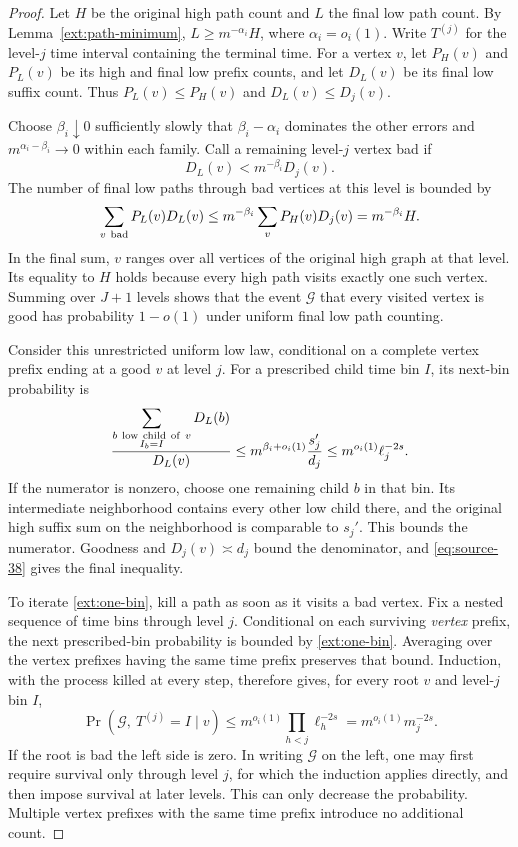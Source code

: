 \begin{proof}
Let \(H\) be the original high path count and \(L\) the final
low path count. By Lemma~\ref{ext:path-minimum},
\(L\geq m^{-\alpha_i}H\), where \(\alpha_i=o_i(1)\).
Write \(T^{(j)}\) for the level-\(j\) time interval containing
the terminal time.
For a vertex \(v\), let \(P_H(v)\) and \(P_L(v)\) be its high
and final low prefix counts, and let \(D_L(v)\) be its final
low suffix count. Thus \(P_L(v)\leq P_H(v)\) and
\(D_L(v)\leq D_j(v)\).

Choose \(\beta_i\downarrow0\) sufficiently slowly that
\(\beta_i-\alpha_i\) dominates the other errors and
\(m^{\alpha_i-\beta_i}\to0\) within each family. Call a remaining
level-\(j\) vertex bad if
\[
                         D_L(v)<m^{-\beta_i}D_j(v).
\]
The number of final low paths through bad vertices at this level
is bounded by
\[
 \sum_{v\ {\rm bad}}P_L(v)D_L(v)
 \leq m^{-\beta_i}\sum_v P_H(v)D_j(v)
 =m^{-\beta_i}H.
\]
In the final sum, \(v\) ranges over all vertices of the original
high graph at that level. Its equality to \(H\) holds because
every high path visits exactly one such vertex. Summing over
\(J+1\) levels shows that
the event \(\mathcal G\) that every visited vertex is good has
probability \(1-o(1)\) under uniform final low path counting.

Consider this unrestricted uniform low law, conditional on a
complete vertex prefix ending at a good \(v\) at level \(j\).
For a prescribed child time bin \(I\), its next-bin probability is
\begin{equation}\label{ext:one-bin}
 \frac{\displaystyle
       \sum_{\substack{b\ {\rm low\ child\ of}\ v\\I_b=I}}D_L(b)}
      {D_L(v)}
 \leq m^{\beta_i+o_i(1)}\frac{s_j'}{d_j}
 \leq m^{o_i(1)}\ell_j^{-2s}.
\end{equation}
If the numerator is nonzero, choose one remaining child \(b\)
in that bin. Its intermediate neighborhood contains every
other low child there, and the original high suffix sum on
the neighborhood is comparable to \(s_j'\). This bounds the
numerator. Goodness and \(D_j(v)\asymp d_j\) bound the
denominator, and \eqref{eq:source-38} gives the final inequality.

To iterate \eqref{ext:one-bin}, kill a path as soon as it
visits a bad vertex. Fix a nested sequence of time bins through
level \(j\). Conditional on each surviving \emph{vertex}
prefix, the next prescribed-bin probability is bounded by
\eqref{ext:one-bin}. Averaging over the vertex prefixes having
the same time prefix preserves that bound. Induction, with
the process killed at every step, therefore gives, for every
root \(v\) and level-\(j\) bin \(I\),
\begin{equation}\label{ext:killed}
 \Pr(\mathcal G,\ T^{(j)}=I\mid v)
       \leq m^{o_i(1)}\prod_{h<j}\ell_h^{-2s}
       =m^{o_i(1)}m_j^{-2s}.
\end{equation}
If the root is bad the left side is zero. In writing
\(\mathcal G\) on the left, one may first require survival only
through level \(j\), for which the induction applies directly,
and then impose survival at later levels. This can only
decrease the probability. Multiple vertex prefixes with the
same time prefix introduce no additional count.


\end{proof}

